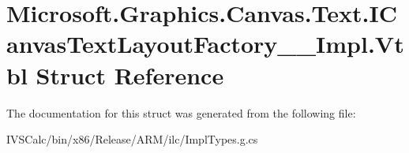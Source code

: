 \hypertarget{struct_microsoft_1_1_graphics_1_1_canvas_1_1_text_1_1_i_canvas_text_layout_factory_____impl_1_1_vtbl}{}\section{Microsoft.\+Graphics.\+Canvas.\+Text.\+I\+Canvas\+Text\+Layout\+Factory\+\_\+\+\_\+\+Impl.\+Vtbl Struct Reference}
\label{struct_microsoft_1_1_graphics_1_1_canvas_1_1_text_1_1_i_canvas_text_layout_factory_____impl_1_1_vtbl}


The documentation for this struct was generated from the following file\+:\begin{DoxyCompactItemize}
\item 
I\+V\+S\+Calc/bin/x86/\+Release/\+A\+R\+M/ilc/Impl\+Types.\+g.\+cs\end{DoxyCompactItemize}
